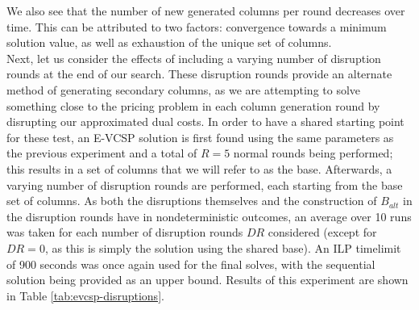 \documentclass[]{article}
\begin{document}
We also see that the number of new generated columns per round decreases over time. This can be attributed to two factors: convergence towards a minimum solution value, as well as exhaustion of the unique set of columns. \\

\noindent Next, let us consider the effects of including a varying number of disruption rounds at the end of our search. These disruption rounds provide an alternate method of generating secondary columns, as we are attempting to solve something close to the pricing problem in each column generation round by disrupting our approximated dual costs. In order to have a shared starting point for these test, an E-VCSP solution is first found using the same parameters as the previous experiment and a total of $R=5$ normal rounds being performed; this results in a set of columns that we will refer to as the base. Afterwards, a varying number of disruption rounds are performed, each starting from the base set of columns. As both the disruptions themselves and the construction of $B_{alt}$ in the disruption rounds have in nondeterministic outcomes, an average over 10 runs was taken for each number of disruption rounds $DR$ considered (except for $DR=0$, as this is simply the solution using the shared base). An ILP timelimit of 900 seconds was once again used for the final solves, with the sequential solution being provided as an upper bound. Results of this experiment are shown in Table \ref{tab:evcsp-disruptions}.
\end{document}
